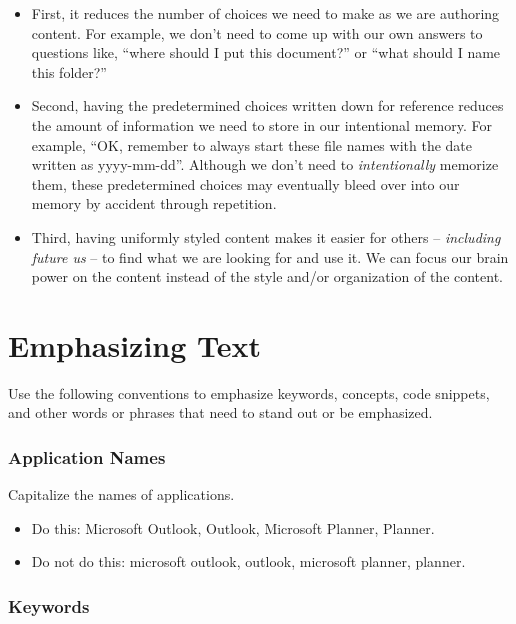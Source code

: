 \documentclass[
  letterpaper,
  DIV=11,
  numbers=noendperiod]{scrreprt}
\providecommand{\tightlist}{%
  \setlength{\itemsep}{0pt}\setlength{\parskip}{0pt}}\usepackage{longtable,booktabs,array}
\begin{document}
\begin{itemize}
\item
  First, it reduces the number of choices we need to make as we are
  authoring content. For example, we don't need to come up with our own
  answers to questions like, ``where should I put this document?'' or
  ``what should I name this folder?''
\item
  Second, having the predetermined choices written down for reference
  reduces the amount of information we need to store in our intentional
  memory. For example, ``OK, remember to always start these file names
  with the date written as yyyy-mm-dd''. Although we don't need to
  \emph{intentionally} memorize them, these predetermined choices may
  eventually bleed over into our memory by accident through repetition.
\item
  Third, having uniformly styled content makes it easier for others --
  \emph{including future us} -- to find what we are looking for and use
  it. We can focus our brain power on the content instead of the style
  and/or organization of the content.
\end{itemize}

\chapter{Emphasizing Text}\label{sec-emph_text}

Use the following conventions to emphasize keywords, concepts, code
snippets, and other words or phrases that need to stand out or be
emphasized.

\subsection{Application Names}\label{application-names}

Capitalize the names of applications.

\begin{itemize}
\tightlist
\item
  Do this: Microsoft Outlook, Outlook, Microsoft Planner, Planner.
\item
  Do not do this: microsoft outlook, outlook, microsoft planner,
  planner.
\end{itemize}

\subsection{Keywords}\label{keywords}
\end{document}
